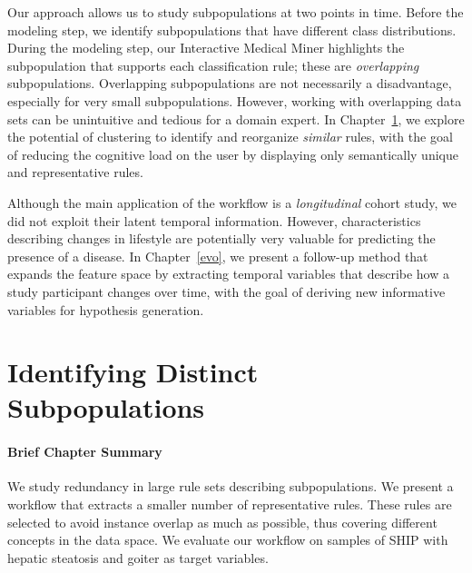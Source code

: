 \documentclass[
  oneside]{book}
\newenvironment{infobox}[1]
  {
  \begin{chapter-summary}
  }
  {
  \end{chapter-summary}
  }
\begin{document}
Our approach allows us to study subpopulations at two points in time.
Before the modeling step, we identify subpopulations that have different class distributions.
During the modeling step, our Interactive Medical Miner highlights the subpopulation that supports each classification rule; these are \emph{overlapping} subpopulations.
Overlapping subpopulations are not necessarily a disadvantage, especially for very small subpopulations.
However, working with overlapping data sets can be unintuitive and tedious for a domain expert.
In Chapter~\ref{sdclu}, we explore the potential of clustering to identify and reorganize \emph{similar} rules, with the goal of reducing the cognitive load on the user by displaying only semantically unique and representative rules.

Although the main application of the workflow is a \emph{longitudinal} cohort study, we did not exploit their latent temporal information.
However, characteristics describing changes in lifestyle are potentially very valuable for predicting the presence of a disease.
In Chapter~\ref{evo}, we present a follow-up method that expands the feature space by extracting temporal variables that describe how a study participant changes over time, with the goal of deriving new informative variables for hypothesis generation.

\hypertarget{sdclu}{%
\chapter{Identifying Distinct Subpopulations}\label{sdclu}}

\begin{infobox}{tasks.pdf}

\hypertarget{brief-chapter-summary-1}{%
\subsubsection*{Brief Chapter Summary}\label{brief-chapter-summary-1}}

We study redundancy in large rule sets describing subpopulations.
We present a workflow that extracts a smaller number of representative rules.
These rules are selected to avoid instance overlap as much as possible, thus covering different concepts in the data space.
We evaluate our workflow on samples of SHIP with hepatic steatosis and goiter as target variables.

\end{infobox}
\end{document}
